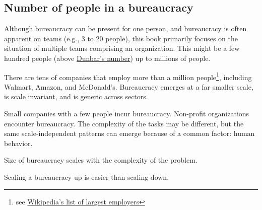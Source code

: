 \subsection{Number of people in a bureaucracy}
Although bureaucracy can be present for one person, and bureaucracy is often apparent on teams (e.g., 3 to 20 people), this book primarily focuses on the situation of multiple teams comprising an organization. This might be a few hundred people (above \href{https://en.wikipedia.org/wiki/Dunbar's_number}{Dunbar's number}) up to millions of people. 

There are tens of companies that employ more than a million people\footnote{see \href{https://en.wikipedia.org/wiki/List_of_largest_employers}{Wikipedia's list of largest employers}}, including Walmart, Amazon, and McDonald's. Bureaucracy emerges at a far smaller scale, is scale invariant, and is generic across sectors. 

Small companies with a few people incur bureaucracy. Non-profit organizations encounter bureaucracy. The complexity of the tasks may be different, but the same scale-independent patterns can emerge because of a common factor: human behavior.

Size of bureaucracy scales with the complexity of the problem. 

Scaling a bureaucracy up is easier than scaling down.